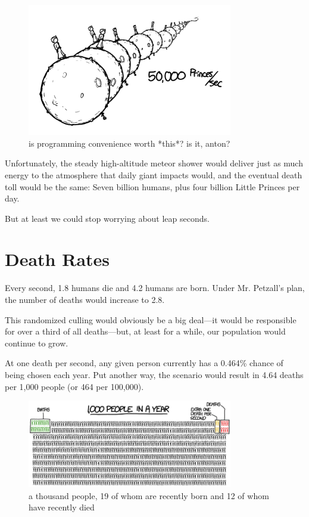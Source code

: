 \begin{figure}[!htbp]
\centering
\includegraphics[scale=0.5, max width=0.8\textwidth]{imgs/a/26/leap_prince_rows.png}
\caption{is programming convenience worth *this*? is it, anton?}
\end{figure}

{Unfortunately, the steady high-altitude meteor shower would deliver just as much energy to the atmosphere that daily giant impacts would, and the eventual death toll would be the same: Seven billion humans, plus four billion Little Princes per day.}

{But at least we could stop worrying about leap seconds.}

{
\chapter{Death Rates}
}

\hfill{}

{Every second, 1.8 humans die and 4.2 humans are born. Under Mr. Petzall’s plan, the number of deaths would increase to 2.8.}

{This randomized culling would obviously be a big deal—it would be responsible for over a third of all deaths—but, at least for a while, our population would continue to grow.}

{At one death per second, any given person currently has a 0.464\% chance of being chosen each year. Put another way, the scenario would result in 4.64 deaths per 1,000 people (or 464 per 100,000).}

\begin{figure}[!htbp]
\centering
\includegraphics[scale=0.5, max width=0.8\textwidth]{imgs/a/27/death_comparison.png}
\caption{a thousand people, 19 of whom are recently born and 12 of whom have recently died}
\end{figure}

